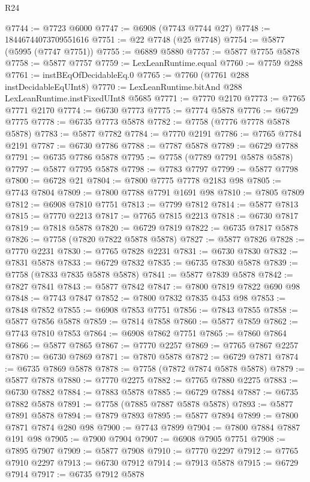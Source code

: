\begin{lexlean}{R24}
\begin{coremodule}
@7744 := @7723 @6000
@7747 := @6908 (@7743 @7744 @27)
@7748 := 18446744073709551616
@7751 := @22 @7748 (@25 @7748)
@7754 := @5877 (@5995 (@7747 @7751))
@7755 := @6889 @5880
@7757 := @5877 @7755 @5878
@7758 := @5877 @7757
@7759 := LexLeanRuntime.equal
@7760 := @7759 @288
@7761 := instBEqOfDecidableEq.{0}
@7765 := @7760 (@7761 @288 instDecidableEqUInt8)
@7770 := LexLeanRuntime.bitAnd @288 LexLeanRuntime.instFixedUInt8 @5685
@7771 := @7770 @2170
@7773 := @7765 @7771 @2170
@7774 := @6730 @7773
@7775 := @7774 @5878
@7776 := @6729 @7775
@7778 := @6735 @7773 @5878
@7782 := @7758 (@7776 @7778 @5878 @5878)
@7783 := @5877 @7782
@7784 := @7770 @2191
@7786 := @7765 @7784 @2191
@7787 := @6730 @7786
@7788 := @7787 @5878
@7789 := @6729 @7788
@7791 := @6735 @7786 @5878
@7795 := @7758 (@7789 @7791 @5878 @5878)
@7797 := @5877 @7795 @5878
@7798 := @7783 @7797
@7799 := @5877 @7798
@7800 := @6728 @21
@7804 := @7800 @7775 @7778 @2183 @98
@7805 := @7743 @7804
@7809 := @7800 @7788 @7791 @1691 @98
@7810 := @7805 @7809
@7812 := @6908 @7810 @7751
@7813 := @7799 @7812
@7814 := @5877 @7813
@7815 := @7770 @2213
@7817 := @7765 @7815 @2213
@7818 := @6730 @7817
@7819 := @7818 @5878
@7820 := @6729 @7819
@7822 := @6735 @7817 @5878
@7826 := @7758 (@7820 @7822 @5878 @5878)
@7827 := @5877 @7826
@7828 := @7770 @2231
@7830 := @7765 @7828 @2231
@7831 := @6730 @7830
@7832 := @7831 @5878
@7833 := @6729 @7832
@7835 := @6735 @7830 @5878
@7839 := @7758 (@7833 @7835 @5878 @5878)
@7841 := @5877 @7839 @5878
@7842 := @7827 @7841
@7843 := @5877 @7842
@7847 := @7800 @7819 @7822 @690 @98
@7848 := @7743 @7847
@7852 := @7800 @7832 @7835 @453 @98
@7853 := @7848 @7852
@7855 := @6908 @7853 @7751
@7856 := @7843 @7855
@7858 := @5877 @7856 @5878
@7859 := @7814 @7858
@7860 := @5877 @7859
@7862 := @7743 @7810 @7853
@7864 := @6908 @7862 @7751
@7865 := @7860 @7864
@7866 := @5877 @7865
@7867 := @7770 @2257
@7869 := @7765 @7867 @2257
@7870 := @6730 @7869
@7871 := @7870 @5878
@7872 := @6729 @7871
@7874 := @6735 @7869 @5878
@7878 := @7758 (@7872 @7874 @5878 @5878)
@7879 := @5877 @7878
@7880 := @7770 @2275
@7882 := @7765 @7880 @2275
@7883 := @6730 @7882
@7884 := @7883 @5878
@7885 := @6729 @7884
@7887 := @6735 @7882 @5878
@7891 := @7758 (@7885 @7887 @5878 @5878)
@7893 := @5877 @7891 @5878
@7894 := @7879 @7893
@7895 := @5877 @7894
@7899 := @7800 @7871 @7874 @280 @98
@7900 := @7743 @7899
@7904 := @7800 @7884 @7887 @191 @98
@7905 := @7900 @7904
@7907 := @6908 @7905 @7751
@7908 := @7895 @7907
@7909 := @5877 @7908
@7910 := @7770 @2297
@7912 := @7765 @7910 @2297
@7913 := @6730 @7912
@7914 := @7913 @5878
@7915 := @6729 @7914
@7917 := @6735 @7912 @5878

\end{coremodule}
\end{lexlean}
